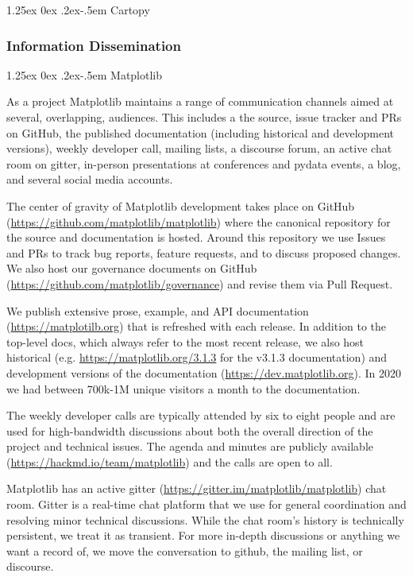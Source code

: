 \documentclass[12pt]{article}
\makeatletter
\numberwithin{page}{section}
\renewcommand{\paragraph}{%
  \@startsection{paragraph}{4}%
  {\z@}{1.25ex \@plus 0ex \@minus .2ex}{-.5em}%
  {\normalfont\normalsize\itshape\bfseries}%
}
\makeatother
\begin{document}
\paragraph{Cartopy}


\subsubsection{Information Dissemination}

\paragraph{Matplotlib}

As a project Matplotlib maintains a range of communication channels
aimed at several, overlapping, audiences.  This includes a
the source, issue tracker and PRs on GitHub,
the published documentation (including historical and development versions),
weekly developer call,
mailing lists,
a discourse forum,
an active chat room on gitter,
in-person presentations at conferences and pydata events,
a blog, and several social media accounts.


The center of gravity of Matplotlib development takes place on GitHub
(\url{https://github.com/matplotlib/matplotlib}) where the canonical
repository for the source and documentation is hosted.  Around this
repository we use Issues and PRs to track bug reports, feature
requests, and to discuss proposed changes.  We also host our
governance documents on GitHub
(\url{https://github.com/matplotlib/governance}) and revise them via
Pull Request.

We publish extensive prose, example, and API documentation
(\url{https://matplotilb.org}) that is refreshed with each release.
In addition to the top-level docs, which always refer to the most
recent release, we also host historical
(e.g. \url{https://matplotlib.org/3.1.3} for the v3.1.3 documentation) and
development versions of the documentation
(\url{https://dev.matplotlib.org}).  In 2020 we had between 700k-1M
unique visitors a month to the documentation.


The weekly developer calls are typically attended by six to eight
people and are used for high-bandwidth discussions about both the
overall direction of the project and technical issues.  The agenda and
minutes are publicly available
(\url{https://hackmd.io/team/matplotlib}) and the calls are open to
all.

Matplotlib has an active gitter
(\url{https://gitter.im/matplotlib/matplotlib}) chat room.  Gitter is
a real-time chat platform that we use for general coordination and
resolving minor technical discussions.  While the chat room's history
is technically persistent, we treat it as transient.  For more
in-depth discussions or anything we want a record of, we move the
conversation to github, the mailing list, or discourse.
\end{document}
